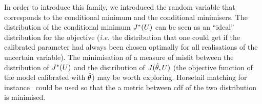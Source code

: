 \documentclass[../../Main_ManuscritThese.tex]{subfiles}
\begin{document}
In order to introduce this family, we introduced the random variable
that corresponds to the conditional minimum and the conditional
minimisers. The distribution of the conditional minimum $J^*(U)$ can
be seen as an ``ideal'' distribution for the objective (\emph{i.e.} the
distribution that one could get if the calibrated parameter had always
been chosen optimally for all realisations of the uncertain
variable). The minimisation of a measure of misfit between the
distribution of $J^*(U)$ and the distribution of $J(\hat{\theta},U)$
(the objective function of the model calibrated with $\hat{\theta}$) may
be worth exploring. Horsetail matching for
instance~\cite{cook_extending_2017,cook_horsetail_2018} could be used
so that the a metric between cdf of the two distribution is minimised.



\markchapterend
\subfileLocal{
	\pagestyle{empty}
	
        
}

\end{document}
